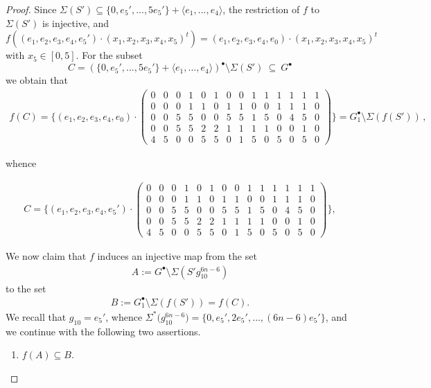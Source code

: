 \documentclass[10pt,a4paper]{amsart}
\begin{document}
\begin{proof}
Since $\Sigma(S')\subseteq \{0,e_5',...,5e_5'\}+ \langle e_1,...,e_4\rangle$, the restriction of $f$ to $\Sigma(S')$ is injective, and 
\[
f\left( (e_1,e_2,e_3,e_4,e_5')\cdot (x_1,x_2,x_3,x_4,x_5)^t\right) =(e_1,e_2,e_3,e_4,e_0)\cdot (x_1,x_2,x_3,x_4,x_5)^t
\]
with $x_5\in [0,5]$. For the subset
$$C = (\{0,e_5',...,5e_5'\}+ \langle e_1,...,e_4\rangle)^{\bullet} \setminus \Sigma(S') \ \subseteq \ G^{\bullet}$$
we obtain that
\begin{align*}
f(C)=
\{(e_1,e_2,e_3,e_4,e_0)\cdot 
\left(\begin{array}{l|l|l|l|l|l|l|l|l|l|l|l|l|l}
	0 & 0 & 0 & 1 & 0 & 1 & 0 & 0 & 1 & 1 & 1 & 1 & 1 & 1\\
	0 & 0 & 0 & 1 & 1 & 0 & 1 & 1 & 0 & 0 & 1 & 1 & 1 & 0\\
	0 & 0 & 5 & 5 & 0 & 0 & 5 & 5 & 1 & 5 & 0 & 4 & 5 & 0\\
	0 & 0 & 5 & 5 & 2 & 2 & 1 & 1 & 1 & 1 & 0 & 0 & 1 & 0\\
	4 & 5 & 0 & 0 & 5 & 5 & 0 & 1 & 5 & 0 & 5 & 0 & 5 & 0
\end{array}\right)
\} = G_1^{\bullet} \setminus \Sigma (f(S')) \,,
\end{align*}

whence

\begin{align*}
C=
\{(e_1,e_2,e_3,e_4,e_5')\cdot 
\left(\begin{array}{l|l|l|l|l|l|l|l|l|l|l|l|l|l}
	0 & 0 & 0 & 1 & 0 & 1 & 0 & 0 & 1 & 1 & 1 & 1 & 1 & 1\\
	0 & 0 & 0 & 1 & 1 & 0 & 1 & 1 & 0 & 0 & 1 & 1 & 1 & 0\\
	0 & 0 & 5 & 5 & 0 & 0 & 5 & 5 & 1 & 5 & 0 & 4 & 5 & 0\\
	0 & 0 & 5 & 5 & 2 & 2 & 1 & 1 & 1 & 1 & 0 & 0 & 1 & 0\\
	4 & 5 & 0 & 0 & 5 & 5 & 0 & 1 & 5 & 0 & 5 & 0 & 5 & 0
\end{array}\right)
\},
\end{align*}


We now claim that $f$ induces an injective map from the set 
\begin{align*}
A := G^\bullet \setminus \Sigma\left(S' g_{10}^{6n-6}\right)
\end{align*}
to the set
\begin{align*}
B := G_1^\bullet \setminus \Sigma\left(f(S')\right) = f(C).
\end{align*}
We  recall that $g_{10} = e_5'$, whence $\Sigma^* \big( g_{10}^{6n-6} \big) = \{0, e_5', 2e_5', \dots, (6n-6)e_5'\}$, and we continue with the following two assertions.
\begin{enumerate}
\item[{\bf A1.}\,] $f (A) \subseteq B$.


\end{enumerate}
\end{proof}
\end{document}
